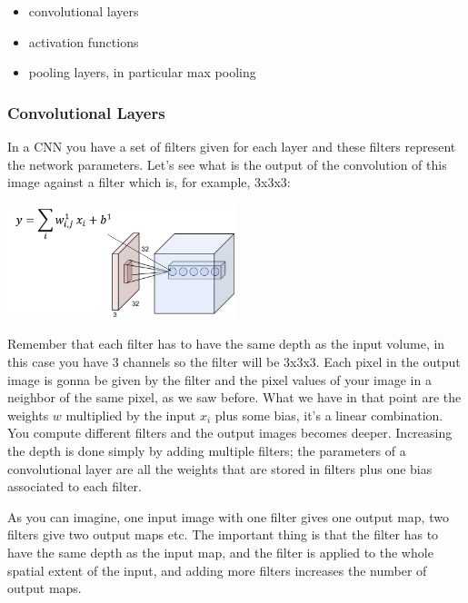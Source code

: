 \begin{itemize}
    \item convolutional layers
    \item activation functions
    \item pooling layers, in particular max pooling
\end{itemize}

\subsubsection{Convolutional Layers}
In a CNN you have a set of filters given for each layer and these filters represent the network parameters. Let's see what is the output of the convolution of this image against a filter which is, for example, 3x3x3:

\begin{center}
    \includegraphics[width=0.5\textwidth]{images_CNN/clayers.PNG}\par
\end{center}
Remember that each filter has to have the same depth as the input volume, in this case you have 3 channels so the filter will be 3x3x3. Each pixel in the output image is gonna be given by the filter and the pixel values of your image in a neighbor of the same pixel, as we saw before. What we have in that point 
are the weights $w$ multiplied by the input $x_{i}$ plus some bias, it's a linear combination. You compute different filters and the output images becomes deeper. Increasing the depth is done simply by adding multiple filters; the parameters of a convolutional layer are all the weights that are stored in filters plus one bias associated to each filter.

As you can imagine, one input image with one filter gives one output map, two filters give two output maps etc. The important thing is that the filter has to have the same depth as the input map, and the filter is applied to the whole spatial extent of the input, and adding more filters increases the number of output maps.

